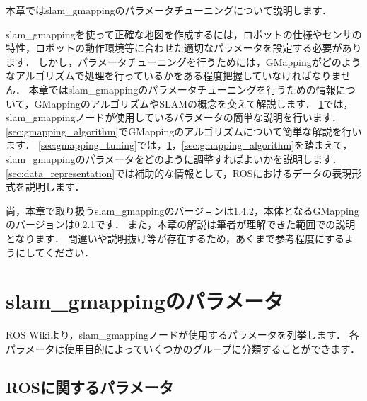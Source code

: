 \documentclass[{../../master}]{subfiles}
\begin{document}
本章では\textsf{slam\_gmapping}のパラメータチューニングについて説明します．

\textsf{slam\_gmapping}を使って正確な地図を作成するには，ロボットの仕様やセンサの特性，ロボットの動作環境等に合わせた適切なパラメータを設定する必要があります．
しかし，パラメータチューニングを行うためには，GMappingがどのようなアルゴリズムで処理を行っているかをある程度把握していなければなりません．
本章では\textsf{slam\_gmapping}のパラメータチューニングを行うための情報について，GMappingのアルゴリズムやSLAMの概念を交えて解説します．
\ref{sec:gmapping_parameters}では，\textsf{slam\_gmapping}ノードが使用しているパラメータの簡単な説明を行います．
\ref{sec:gmapping_algorithm}でGMappingのアルゴリズムについて簡単な解説を行います．
\ref{sec:gmapping_tuning}では，\ref{sec:gmapping_parameters}，\ref{sec:gmapping_algorithm}を踏まえて，\textsf{slam\_gmapping}のパラメータをどのように調整すればよいかを説明します．
\ref{sec:data_representation}では補助的な情報として，ROSにおけるデータの表現形式を説明します．

尚，本章で取り扱う\textsf{slam\_gmapping}のバージョンは1.4.2，本体となるGMappingのバージョンは0.2.1です．
また，本章の解説は筆者が理解できた範囲での説明となります．
間違いや説明抜け等が存在するため，あくまで参考程度にするようにしてください．

\section{\textsf{slam\_gmapping}のパラメータ}
\label{sec:gmapping_parameters}

ROS Wikiより，\textsf{slam\_gmapping}ノードが使用するパラメータを列挙します．
各パラメータは使用目的によっていくつかのグループに分類することができます．

\subsection{ROSに関するパラメータ}
\end{document}
